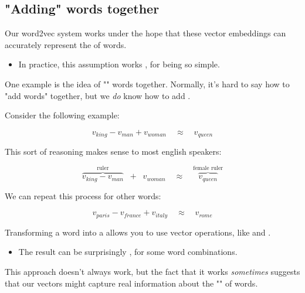          





    

    \pagebreak
    
    \subsection{"Adding" words together}

        Our word2vec system works under the hope that these vector embeddings can accurately represent the  of words.

        \begin{itemize}
            \item In practice, this assumption works , for being so simple.
        \end{itemize}

        One example is the idea of "" words together. Normally, it's hard to say how to "add words" together, but we \textit{do} know how to add .

        Consider the following example:

        \begin{equation}
            v_{king} - v_{man} + v_{woman}  \quad\approx\quad v_{queen}
        \end{equation}

        This sort of reasoning makes sense to most english speakers: 

        \begin{equation}
            \overbrace{ v_{king} - v_{man} }^{\text{ruler}} \;\;+\;\; v_{woman} 
            \quad\approx\quad \overbrace{v_{queen}}^{\text{female ruler}}
        \end{equation}

        We can repeat this process for other words:

        \begin{equation}
            v_{paris} - v_{france} + v_{italy}  \quad\approx\quad v_{rome}
        \end{equation}

        \begin{concept}
            Transforming a word into a  allows you to use vector operations, like  and .

            \begin{itemize}
                \item The result can be surprisingly , for some word combinations.
            \end{itemize}

            This approach doesn't always work, but the fact that it works \textit{sometimes} suggests that our vectors might capture real information about the "" of words.
        \end{concept}

